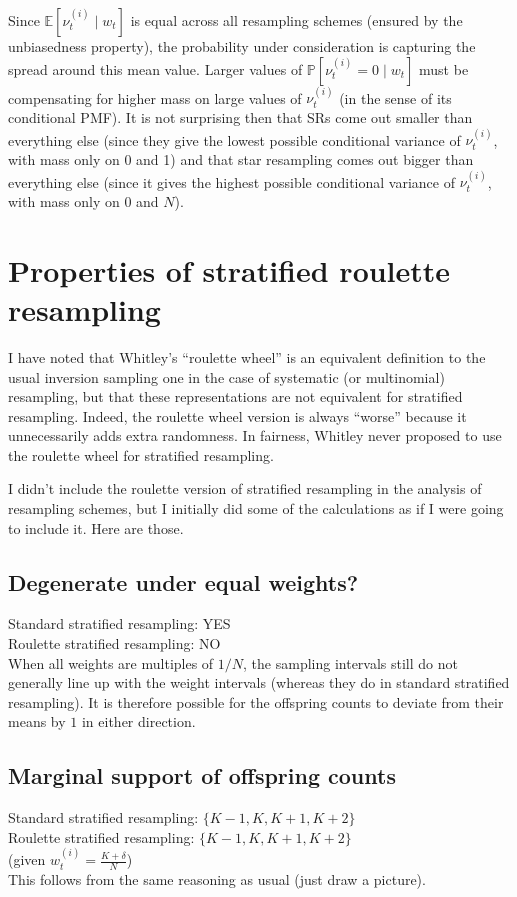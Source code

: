 \documentclass[fleqn]{article}
\newcommand{\Prob}{\mathbb{P}}
\newcommand{\E}{\mathbb{E}}
\newcommand{\1}[1]{\mathbb{I}_{#1}}
\begin{document}
\vspace*{5pt}
Since $\E[ \nu_t^{(i)} \mid w_t ]$ is equal across all resampling schemes (ensured by the unbiasedness property), the probability under consideration is capturing the spread around this mean value. Larger values of $\Prob[ \nu_t^{(i)} =0 \mid w_t ]$ must be compensating for higher mass on large values of $\nu_t^{(i)}$ (in the sense of its conditional PMF).
It is not surprising then that SRs come out smaller than everything else (since they give the lowest possible conditional variance of $\nu_t^{(i)}$, with mass only on 0 and 1) and that star resampling comes out bigger than everything else (since it gives the highest possible conditional variance of $\nu_t^{(i)}$, with mass only on 0 and $N$).



\section{Properties of stratified roulette resampling}
I have noted that Whitley's ``roulette wheel'' is an equivalent definition to the usual inversion sampling one in the case of systematic (or multinomial) resampling, but that these representations are not equivalent for stratified resampling. Indeed, the roulette wheel version is always ``worse'' because it unnecessarily adds extra randomness. In fairness, Whitley never proposed to use the roulette wheel for stratified resampling.

I didn't include the roulette version of stratified resampling in the analysis of resampling schemes, but I initially did some of the calculations as if I were going to include it. Here are those.


\subsection*{Degenerate under equal weights?}
Standard stratified resampling: YES\\
Roulette stratified resampling: NO\\[5pt]
When all weights are multiples of $1/N$, the sampling intervals still do not generally line up with the weight intervals (whereas they do in standard stratified resampling). It is therefore possible for the offspring counts to deviate from their means by $1$ in either direction.


\subsection*{Marginal support of offspring counts}
Standard stratified resampling: $\{K-1, K, K+1, K+2\}$\\
Roulette stratified resampling: $\{K-1, K, K+1, K+2\}$\\
(given $w_t^{(i)} = \frac{K+\delta}{N}$)\\[5pt]
This follows from the same reasoning as usual (just draw a picture).
\end{document}
